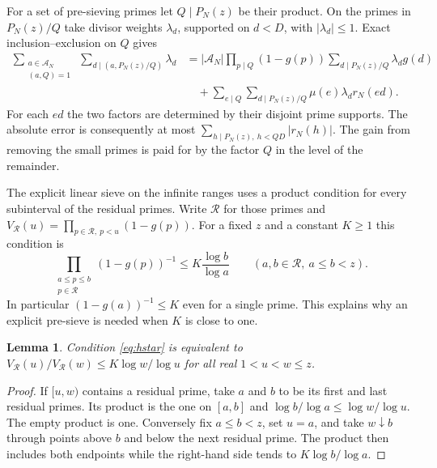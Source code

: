 \documentclass[11pt]{article}
\newtheorem{lemma}[theorem]{Lemma}
\theoremstyle{remark}\newtheorem{remark}[theorem]{Remark}
\begin{document}
For a set of pre-sieving primes let $Q\mid P_N(z)$ be their product.
On the primes in $P_N(z)/Q$ take divisor weights $\lambda_d$, supported
on $d<D$, with $|\lambda_d|\le1$. Exact inclusion--exclusion on $Q$
gives
\begin{align*}
 \sum_{\substack{a\in \mathcal A_N\\(a,Q)=1}}\ \sum_{d\mid (a,P_N(z)/Q)}\lambda_d
 &= |\mathcal A_N|\prod_{p\mid Q}(1-g(p))
        \sum_{d\mid P_N(z)/Q}\lambda_d g(d) \\
 &\quad+\sum_{e\mid Q}\sum_{d\mid P_N(z)/Q}\mu(e)\lambda_d r_N(ed).
\end{align*}
For each $ed$ the two factors are determined by their disjoint prime
supports. The absolute error is consequently at most
$\sum_{h\mid P_N(z),\ h<QD}|r_N(h)|$. The gain from removing the small
primes is paid for by the factor $Q$ in the level of the remainder.

The explicit linear sieve on the infinite ranges uses a product condition
for every subinterval of the residual primes. Write $\mathcal R$ for those
primes and $V_{\mathcal R}(u)=\prod_{p\in\mathcal R,\ p<u}(1-g(p))$.
For a fixed $z$ and a constant $K\ge1$ this condition is
\begin{equation}\label{eq:hstar}
 \prod_{\substack{a\le p\le b\\ p\in\mathcal R}}
       (1-g(p))^{-1}\le K\frac{\log b}{\log a}
 \qquad(a,b\in\mathcal R,\ a\le b<z).
\end{equation}
In particular $(1-g(a))^{-1}\le K$ even for a single prime. This
explains why an explicit pre-sieve is needed when $K$ is close to one.

\begin{lemma}\label{lem:closed}
Condition \eqref{eq:hstar} is equivalent to
$V_{\mathcal R}(u)/V_{\mathcal R}(w)\le K\log w/\log u$
for all real $1<u<w\le z$.
\end{lemma}
\begin{proof}
If $[u,w)$ contains a residual prime, take $a$ and $b$ to be its first
and last residual primes. Its product is the one on $[a,b]$ and
$\log b/\log a\le\log w/\log u$. The empty product is one.
Conversely fix $a\le b<z$, set $u=a$, and take $w\downarrow b$
through points above $b$ and below the next residual prime.
The product then includes both endpoints while the right-hand side
tends to $K\log b/\log a$.
\end{proof}
\end{document}
